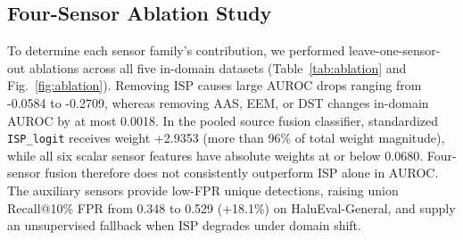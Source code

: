 \documentclass{ieeeaccess}
\begin{document}
\subsection{Four-Sensor Ablation Study}
To determine each sensor family's contribution, we performed leave-one-sensor-out ablations across all five in-domain datasets (Table~\ref{tab:ablation} and Fig.~\ref{fig:ablation}). Removing ISP causes large AUROC drops ranging from -0.0584 to -0.2709, whereas removing AAS, EEM, or DST changes in-domain AUROC by at most 0.0018. In the pooled source fusion classifier, standardized \texttt{ISP\_logit} receives weight +2.9353 (more than 96\% of total weight magnitude), while all six scalar sensor features have absolute weights at or below 0.0680. Four-sensor fusion therefore does not consistently outperform ISP alone in AUROC. The auxiliary sensors provide low-FPR unique detections, raising union Recall@10\% FPR from 0.348 to 0.529 (+18.1\%) on HaluEval-General, and supply an unsupervised fallback when ISP degrades under domain shift.

\begin{table}[t]
\centering
\caption{Leave-One-Sensor-Out Ablation and Low-FPR Complementarity}
\label{tab:ablation}
\end{table}
\end{document}
